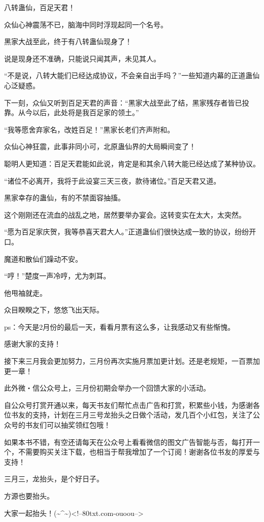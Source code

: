 \begin{this_body}
八转蛊仙，百足天君！

众仙心神震荡不已，脑海中同时浮现起同一个名号。

黑家大战至此，终于有八转蛊仙现身了！

说是现身还不准确，只能说只闻其声，未见其人。

“不是说，八转大能们已经达成协议，不会亲自出手吗？”一些知道内幕的正道蛊仙心泛疑惑。

下一刻，众仙又听到百足天君的声音：“黑家大战至此了结，黑家残存者皆已投靠。从今以后，此处将是我百足家的领土。”

“我等愿舍弃家名，改姓百足！”黑家长老们齐声附和。

众仙心神狂震，此事非同小可，北原蛊仙界的大局瞬间变了！

聪明人更知道：百足天君能如此说，肯定是和其余八转大能已经达成了某种协议。

“诸位不必离开，我将于此设宴三天三夜，款待诸位。”百足天君又道。

黑家幸存的蛊仙，有的不禁面容抽搐。

这个刚刚还在流血的战乱之地，居然要举办宴会。这转变实在太大，太突然。

“愿为百足家庆贺，我等恭喜天君大人。”正道蛊仙们很快达成一致的协议，纷纷开口。

魔道和散仙们躁动不安。

“哼！”楚度一声冷哼，尤为刺耳。

他甩袖就走。

众目睽睽之下，悠悠飞出天际。

ps：今天是2月份的最后一天，看看月票有这么多，让我感动又有些惭愧。

感谢大家的支持！

接下来三月我会更加努力，三月份再次实施月票加更计划。还是老规矩，一百票加更一章！

此外微・信公众号上，三月份初期会举办一个回馈大家的小活动。

自公众号打赏开通以来，每天书友们帮忙点击广告和打赏，积累些小钱，为感谢各位书友的支持，计划在三月三号龙抬头之日做个活动，发几百个小红包，关注了公众号的书友们可以抽奖领红包哦！

如果本书不错，有空还请每天在公众号上看看微信的图文广告智能与否，每打开一个，不需要购买关注下载，也相当于帮我增加了一个订阅！谢谢各位书友的厚爱与支持！

三月三，龙抬头，是个好日子。

方源也要抬头。

大家一起抬头！(\~{}\^{}\~{})<!--80txt.com-ouoou-->

\end{this_body}

